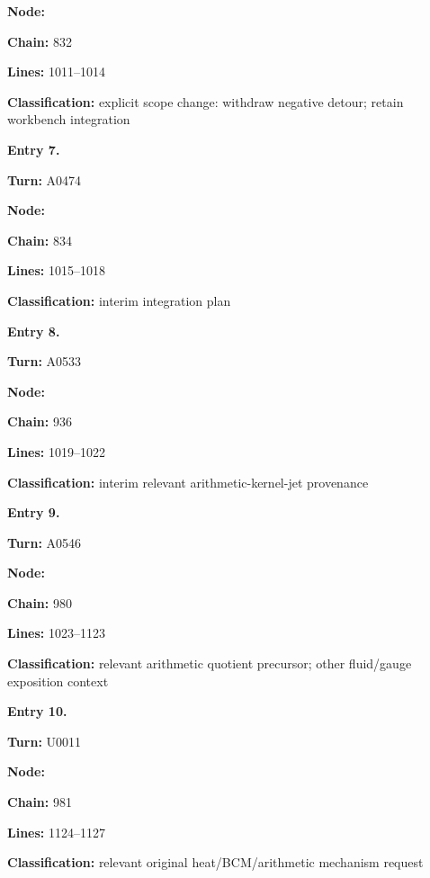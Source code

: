 \textbf{Node:} \protect{}

\textbf{Chain:} 832

\textbf{Lines:} 1011--1014

\textbf{Classification:} explicit scope change: withdraw negative
detour; retain workbench integration


\textbf{Entry 7.}

\textbf{Turn:} A0474

\textbf{Node:} \protect{}

\textbf{Chain:} 834

\textbf{Lines:} 1015--1018

\textbf{Classification:} interim integration plan


\textbf{Entry 8.}

\textbf{Turn:} A0533

\textbf{Node:} \protect{}

\textbf{Chain:} 936

\textbf{Lines:} 1019--1022

\textbf{Classification:} interim relevant arithmetic-kernel-jet
provenance


\textbf{Entry 9.}

\textbf{Turn:} A0546

\textbf{Node:} \protect{}

\textbf{Chain:} 980

\textbf{Lines:} 1023--1123

\textbf{Classification:} relevant arithmetic quotient precursor; other
fluid/gauge exposition context


\textbf{Entry 10.}

\textbf{Turn:} U0011

\textbf{Node:} \protect{}

\textbf{Chain:} 981

\textbf{Lines:} 1124--1127

\textbf{Classification:} relevant original heat/BCM/arithmetic mechanism
request


